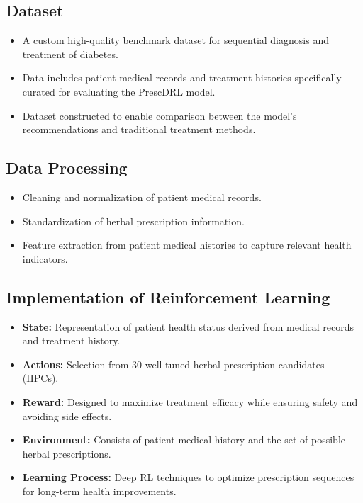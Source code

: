 \subsection*{Dataset}
\begin{itemize}
    \item A custom high-quality benchmark dataset for sequential diagnosis and treatment of diabetes.
    \item Data includes patient medical records and treatment histories specifically curated for evaluating the PrescDRL model.
    \item Dataset constructed to enable comparison between the model's recommendations and traditional treatment methods.
\end{itemize}

\subsection*{Data Processing}
\begin{itemize}
    \item Cleaning and normalization of patient medical records.
    \item Standardization of herbal prescription information.
    \item Feature extraction from patient medical histories to capture relevant health indicators.
\end{itemize}

\subsection*{Implementation of Reinforcement Learning}
\begin{itemize}
    \item \textbf{State:} Representation of patient health status derived from medical records and treatment history.
    \item \textbf{Actions:} Selection from 30 well-tuned herbal prescription candidates (HPCs).
    \item \textbf{Reward:} Designed to maximize treatment efficacy while ensuring safety and avoiding side effects.
    \item \textbf{Environment:} Consists of patient medical history and the set of possible herbal prescriptions.
    \item \textbf{Learning Process:} Deep RL techniques to optimize prescription sequences for long-term health improvements.
\end{itemize}

